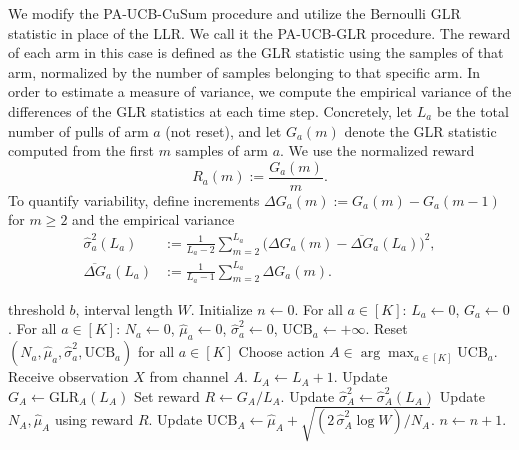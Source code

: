 \documentclass[letterpaper, 10 pt, conference]{ieeeconf}  %
\begin{document}
We modify the PA-UCB-CuSum procedure and utilize the Bernoulli GLR statistic in place of the LLR. We call it the PA-UCB-GLR procedure. The reward of each arm in this case is defined as the GLR statistic using the samples of that arm, normalized by the number of samples belonging to that specific arm. In order to estimate a measure of variance, we compute the empirical variance of the differences of the GLR statistics at each time step. Concretely, let $L_a$ be the total number of pulls of arm $a$ (not reset), and let $G_a(m)$ denote the GLR statistic computed from the first $m$ samples of arm $a$.
We use the normalized reward
\[
R_a(m):=\frac{G_a(m)}{m}.
\]
To quantify variability, define increments $\Delta G_a(m):=G_a(m)-G_a(m-1)$ for $m\ge2$ and the empirical variance
\begin{align*}
\widehat{\sigma}^2_a(L_a)
&:= \frac{1}{L_a-2}\sum_{m=2}^{L_a}\Big(\Delta G_a(m)-\overline{\Delta G}_a(L_a)\Big)^2,
\\
\overline{\Delta G}_a(L_a)
&:=\frac{1}{L_a-1}\sum_{m=2}^{L_a}\Delta G_a(m).
\end{align*}





\begin{algorithm}[htb]
    \small
  \caption{PA-UCB-GLR Procedure}
  \label{alg:PA_UCB_B_GLR}
  \begin{algorithmic}
     threshold $b$, interval length $W$.
    \STATE Initialize $n\leftarrow 0$. For all $a\in[K]$: $L_a\leftarrow 0$, $G_a\leftarrow 0$.
    \STATE For all $a\in[K]$: $N_a\leftarrow 0$, $\widehat\mu_a\leftarrow 0$, $\widehat\sigma_a^2\leftarrow 0$, $\mathrm{UCB}_a\leftarrow +\infty$.
    \REPEAT
        \STATE Reset $(N_a,\widehat\mu_a,\widehat\sigma_a^2,\mathrm{UCB}_a)$ for all $a\in[K]$
      \ENDIF
      \STATE Choose action $A \in \arg\max_{a\in[K]} \mathrm{UCB}_a$.
      \STATE Receive observation $X$ from channel $A$.
      \STATE $L_A \leftarrow L_A + 1$.
      \STATE Update $G_A \leftarrow \mathrm{GLR}_A(L_A)$
      \STATE Set reward $R \leftarrow G_A/L_A$.
      \STATE Update $\widehat\sigma_A^2 \leftarrow \widehat\sigma_A^2(L_A)$
      \STATE Update $N_A,\widehat\mu_A$ using reward $R$.
      \STATE Update $\mathrm{UCB}_A \leftarrow \widehat\mu_A + \sqrt{(2\,\widehat\sigma_A^2 \log W)/N_A}$.
      \STATE $n \leftarrow n + 1$.
  \end{algorithmic}
\end{algorithm}
\end{document}
